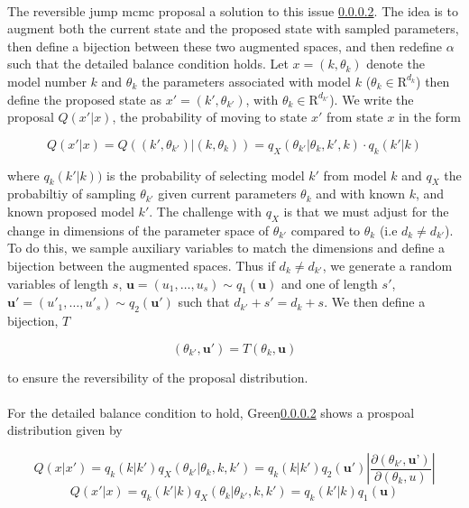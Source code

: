 \paragraph{}The reversible jump mcmc proposal a solution to this issue \ref{}. The idea is to augment both the current state and the proposed state with sampled parameters, then define a bijection between these two augmented spaces, and then redefine $\alpha$ such that the detailed balance condition holds.  Let $x = (k, \theta_k)$ denote the model number $k$ and $\theta_k$ the parameters associated with model $k$ ($\theta_k \in \mathrm{R}^{d_k}$) then define the proposed state as $x' = (k', \theta_{k'})$, with $\theta_k \in \mathrm{R}^{d_{k'}}$). We write the proposal $Q(x' | x)$, the probability of moving to state $x'$ from state $x$ in the form

\begin{equation}
 Q(x'| x) = Q\left((k', \theta_{k'}) | (k, \theta_k) \right) = q_X(  \theta_{k'} |  \theta_k, k', k) \cdot q_k(k' | k)
\end{equation}

where $q_k(k' | k))$ is  the probability of selecting model $k'$ from model $k$ and $q_X$ the probabiltiy of sampling $\theta_{k'}$ given current parameters $\theta_k$ and with known  $k$, and known proposed model $k'$. The challenge with $q_X$ is that we must adjust for the change in dimensions of the parameter space of $\theta_{k'}$ compared to $\theta_k$ (i.e $d_k \neq d_{k'}$). To do this, we sample auxiliary variables to match the dimensions and define a bijection between the augmented spaces. Thus if $d_k \neq d_{k'}$, we generate a random variables of length $s$, $\mathbf{u} = (u_1, \dots, u_s) \sim q_1(\mathbf{u})$ and one of length $s'$, $\mathbf{u'} = (u'_1, \dots, u'_s) \sim q_2(\mathbf{u}')$ such that $d_{k'} + s'= d_k + s$. We then define a bijection, $T$

\begin{equation}
\label{eq:T}
(\theta_{k'}, \mathbf{u'}) = T(\theta_k, \mathbf{u}) 
\end{equation}

to ensure the reversibility of the proposal distribution. 

\paragraph{}For the detailed balance condition to hold, Green\ref{} shows a prospoal distribution given by

$$Q(x | x') = q_k(k|k') q_X(\theta_{k'} | \theta_k, k, k') = q_k(k|k')q_2(\textbf{u}')\left|\frac{\partial(\theta_{k'}, \textbf{u'})}{\partial(\theta_k, u)} \right|$$ 
$$Q(x' | x) = q_k(k'|k) q_X(\theta_k | \theta_{k'}, k, k') = q_k(k'|k)q_1(\textbf{u})$$ 


